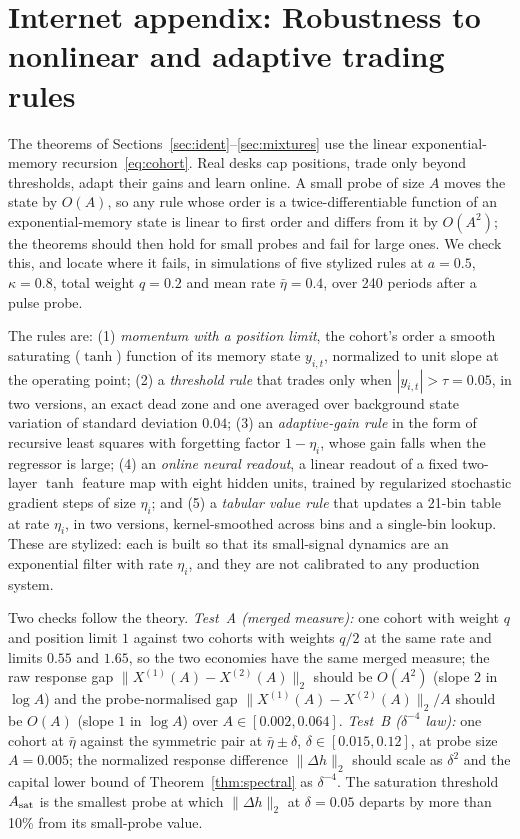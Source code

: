 \documentclass[12pt]{article}
\theoremstyle{definition}
\theoremstyle{remark}
\begin{document}
\section{Internet appendix: Robustness to nonlinear and adaptive trading rules}\label{sec:learners}

The theorems of Sections~\ref{sec:ident}--\ref{sec:mixtures} use the linear exponential-memory recursion~\eqref{eq:cohort}. Real desks cap positions, trade only beyond thresholds, adapt their gains and learn online. A small probe of size $A$ moves the state by $O(A)$, so any rule whose order is a twice-differentiable function of an exponential-memory state is linear to first order and differs from it by $O(A^2)$; the theorems should then hold for small probes and fail for large ones. We check this, and locate where it fails, in simulations of five stylized rules at $a=0.5$, $\kappa=0.8$, total weight $q=0.2$ and mean rate $\bar\eta=0.4$, over 240 periods after a pulse probe.

The rules are: (1) \emph{momentum with a position limit}, the cohort's order a smooth saturating ($\tanh$) function of its memory state $y_{i,t}$, normalized to unit slope at the operating point; (2) a \emph{threshold rule} that trades only when $|y_{i,t}|>\tau=0.05$, in two versions, an exact dead zone and one averaged over background state variation of standard deviation $0.04$; (3) an \emph{adaptive-gain rule} in the form of recursive least squares with forgetting factor $1-\eta_i$, whose gain falls when the regressor is large; (4) an \emph{online neural readout}, a linear readout of a fixed two-layer $\tanh$ feature map with eight hidden units, trained by regularized stochastic gradient steps of size $\eta_i$; and (5) a \emph{tabular value rule} that updates a 21-bin table at rate $\eta_i$, in two versions, kernel-smoothed across bins and a single-bin lookup. These are stylized: each is built so that its small-signal dynamics are an exponential filter with rate $\eta_i$, and they are not calibrated to any production system.

Two checks follow the theory. \emph{Test~A (merged measure):} one cohort with weight $q$ and position limit $1$ against two cohorts with weights $q/2$ at the same rate and limits $0.55$ and $1.65$, so the two economies have the same merged measure; the raw response gap $\|X^{(1)}(A)-X^{(2)}(A)\|_2$ should be $O(A^2)$ (slope $2$ in $\log A$) and the probe-normalised gap $\|X^{(1)}(A)-X^{(2)}(A)\|_2/A$ should be $O(A)$ (slope $1$ in $\log A$) over $A\in[0.002,0.064]$. \emph{Test~B ($\delta^{-4}$ law):} one cohort at $\bar\eta$ against the symmetric pair at $\bar\eta\pm\delta$, $\delta\in[0.015,0.12]$, at probe size $A=0.005$; the normalized response difference $\|\Delta h\|_2$ should scale as $\delta^2$ and the capital lower bound of Theorem~\ref{thm:spectral} as $\delta^{-4}$. The saturation threshold $A_{\rm sat}$ is the smallest probe at which $\|\Delta h\|_2$ at $\delta=0.05$ departs by more than 10\% from its small-probe value.
\end{document}
